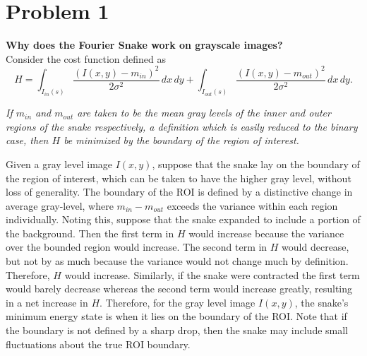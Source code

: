 \documentclass[aps,letterpaper,10pt]{article}
\begin{document}
\section{Problem 1}
\textbf{Why does the Fourier Snake work on grayscale images?}\\

Consider the cost function defined as $$H = \int_{I_{in}(s)} \frac{(I(x,y)-m_{in})^2}{2\sigma^2}\,dx\,dy + \int_{I_{out}(s)} \frac{(I(x,y)-m_{out})^2}{2\sigma^2}\,dx\,dy.$$

\emph{ If $m_{in}$ and $m_{out}$ are taken to be the mean gray levels of the inner and outer regions of the snake respectively, a definition which is easily reduced to the binary case, then $H$ be minimized by the boundary of the region of interest.}  

Given a gray level image $I(x,y)$, suppose that the snake lay on the boundary of the region of interest, which can be taken to have the higher gray level, without loss of generality.  The boundary of the ROI is defined by a distinctive change in average gray-level, where $m_{in} - m_{out}$ exceeds the variance within each region individually.  Noting this, suppose that the snake expanded to include a portion of the background.  Then the first term in $H$ would increase because the variance over the bounded region would increase.  The second term in $H$ would decrease, but not by as much because the variance would not change much by definition.  Therefore, $H$ would increase. Similarly, if the snake were contracted the first term would barely decrease whereas the second term would increase greatly, resulting in a net increase in $H$.  Therefore, for the gray level image $I(x,y)$, the snake's minimum energy state is when it lies on the boundary of the ROI.  Note that if the boundary is not defined by a sharp drop, then the snake may include small fluctuations about the true ROI boundary.
\end{document}
